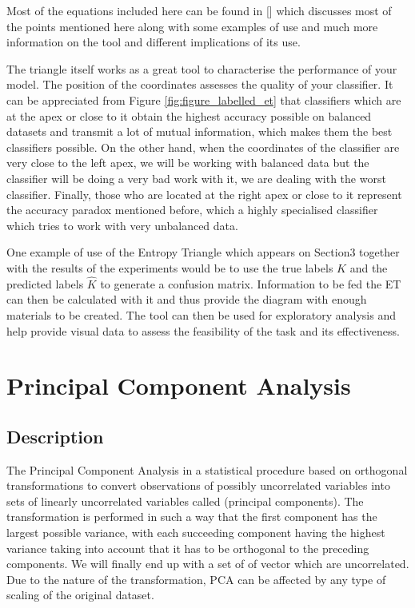 Most of the equations included here can be found in [] which discusses most of the points mentioned here along with some examples of use and much more information on the tool and different implications of its use. \par

The triangle itself works as a great tool to characterise the performance of your model. The position of the coordinates assesses the quality of your classifier. It can be appreciated from Figure \ref{fig:figure_labelled_et} that classifiers which are at the apex or close to it obtain the highest accuracy possible on balanced datasets and transmit a lot of mutual information, which makes them the best classifiers possible. On the other hand, when the coordinates of the classifier are very close to the left apex, we will be working with balanced data but the classifier will be doing a very bad work with it, we are dealing with the worst classifier. Finally, those who are located at the right apex or close to it represent the accuracy paradox mentioned before, which a highly specialised classifier which tries to work with very unbalanced data.\par

One example of use of the Entropy Triangle which appears on Section3 together with the results of the experiments would be to use the true labels $K$ and the predicted labels $\hat{K}$ to generate a confusion matrix. Information to be fed the ET can then be calculated with it and thus provide the diagram with enough materials to be created. The tool can then be used for exploratory analysis and help provide visual data to assess the feasibility of the task and its effectiveness.\par

\section{Principal Component Analysis}
\subsection{Description}
The Principal Component Analysis in a statistical procedure based on orthogonal transformations to convert observations of possibly uncorrelated variables into sets of linearly uncorrelated variables called (principal components). The transformation is performed in such a way that the first component has the largest possible variance, with each succeeding component having the highest variance taking into account that it has to be orthogonal to the preceding components. We will finally end up with a set of of vector which are uncorrelated. Due to the nature of the transformation, PCA can be affected by any type of scaling of the original dataset. \par

